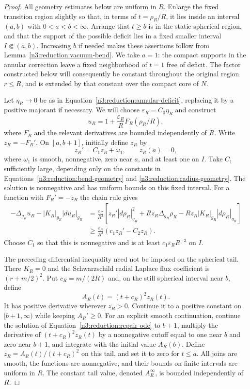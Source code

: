 \begin{proof}
All geometry estimates below are uniform in $R$.  Enlarge the fixed
transition region slightly so that, in terms of $t=\rho_R/R$, it lies
inside an interval $(a,b)$ with $0<a<b<\infty$.  Arrange that $t\ge b$
is in the static spherical region, and that the support of the possible
deficit lies in a fixed smaller interval $I\Subset(a,b)$.  Increasing
$b$ if needed makes these assertions follow from
Lemma~\ref{n3:reduction:vacuum-bend}.
We take $a=1$: the compact supports in the annular correction leave
a fixed neighborhood of $t=1$ free of deficit.  The factor constructed
below will consequently be constant throughout the original region
$r\le R$, and is extended by that constant over the compact core of $N$.

Let $\eta_R\to0$ be as in
Equation~\eqref{n3:reduction:annular-deficit}, replacing it by a positive
majorant if necessary.  We will choose $\varepsilon_R=C_0\eta_R$ and
construct
\[
 u_R=1+\frac{\varepsilon_R}{R}F_R(\rho_R/R),
\]
where $F_R$ and the relevant derivatives are bounded independently of
$R$.  Write $z_R=-F_R'$.  On $[a,b+1]$, initially define $z_R$ by
\begin{equation}
 \label{n3:reduction:repair-ode}
 z_R'=C_1z_R+\omega_1,
 \qquad z_R(a)=0,
\end{equation}
where $\omega_1$ is smooth, nonnegative, zero near $a$, and at least one
on $I$.  Take $C_1$ sufficiently large, depending only on the constants
in Equations~\eqref{n3:reduction:bend-geometry} and
\eqref{n3:reduction:radius-geometry}.  The solution is nonnegative and
has uniform bounds on this fixed interval.  For a function with
$F_R'=-z_R$ the chain rule gives
\begin{align*}
 -\Delta_{g_R}u_R-|K_R|_{g_R}|du_R|_{g_R}
 &=\frac{\varepsilon_R}{R^3}
   \left[z_R'|d\rho_R|_{g_R}^2
       +Rz_R\Delta_{g_R}\rho_R
       -Rz_R|K_R|_{g_R}|d\rho_R|_{g_R}\right]\\
 &\ge\frac{\varepsilon_R}{R^3}
       (c_1z_R'-C_2z_R).
\end{align*}
Choose $C_1$ so that this is nonnegative and is at least
$c_1\varepsilon_RR^{-3}$ on $I$.

The preceding differential inequality need not be imposed on the
spherical tail.  There $K_R=0$ and the Schwarzschild radial Laplace flux
coefficient is $(r+m/2)^2$.  Put $c_R=m/(2R)$ and, on the still spherical
interval near $b$, define
\[
 A_R(t)=(t+c_R)^2z_R(t).
\]
It has positive derivative wherever $z_R>0$.  Continue it to a positive
constant on $[b+1,\infty)$ while keeping $A_R'\ge0$.  For an explicit
smooth continuation, continue the solution of
Equation~\eqref{n3:reduction:repair-ode} to $b+1$, multiply the derivative
of $(t+c_R)^2z_R(t)$ by a nonnegative cutoff equal to one near $b$ and
zero near $b+1$, and integrate with the initial value $A_R(b)$.
Define $z_R=A_R(t)/(t+c_R)^2$ on this tail, and set it to zero for
$t\le a$.  All joins are smooth, the functions are nonnegative, and
their bounds on finite intervals are uniform in $R$.  The constant
tail value, denoted $A_R^\infty$, is bounded independently of $R$.


\end{proof}
